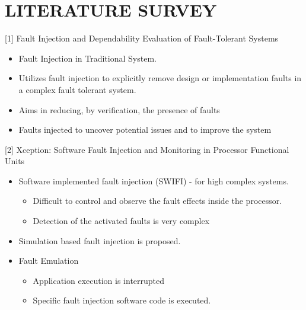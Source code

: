 \documentclass[xcolor=x11names,compress]{beamer}
\renewcommand{\(}{\begin{columns}}
\renewcommand{\)}{\end{columns}}
\newcommand{\<}[1]{\begin{column}{#1}}
\renewcommand{\>}{\end{column}}
\begin{document}
\section{\scshape LITERATURE SURVEY}
\begin{frame}
\end{frame}
\begin{frame}{[1] Fault Injection and
		Dependability Evaluation of Fault-Tolerant Systems}
\begin{itemize}
\item Fault Injection in Traditional System.
\newline
\item Utilizes fault injection to explicitly remove design or implementation faults in a complex fault tolerant system.
\newline
\item Aims in reducing, by verification, the presence of faults
\newline
\item Faults injected to uncover potential issues and to improve the system
\end{itemize}
\end{frame}


\begin{frame}{[2] Xception: Software Fault Injection and Monitoring in Processor Functional Units}
	\begin{itemize}
		\item Software implemented fault injection (SWIFI) - for high complex systems.
		\newline
		\begin{itemize}
			\item Difficult to control and observe the fault effects
			inside the processor.
		
			\item Detection of the activated faults is very complex
			\newline
		\end{itemize}
		\item Simulation based fault injection is proposed.
		\newline
		\item Fault Emulation
		\begin{itemize}
			\item Application execution is interrupted
			\item Specific fault
			injection software code is executed.
		\end{itemize}
	\end{itemize}
\end{frame}
\end{document}
